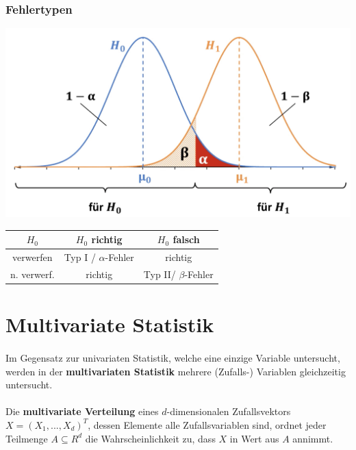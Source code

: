 \documentclass[a3paper, 8pt]{extarticle}
\begin{document}
\begin{multicols*}{5}
\subsubsection{Fehlertypen}
\begin{center}
\includegraphics[width=0.8\columnwidth]{Untitled 2.jpg}
\end{center}

    
\begin{center}
\begin{tabular}{ c | c | c }
 $H_0$ & $H_0$ richtig & $H_0$ falsch\\ \hline 
 verwerfen & Typ I / $\alpha$-Fehler & richtig \\
 n. verwerf. & richtig & Typ II/ $\beta$-Fehler
\end{tabular}
\end{center}

\section{ Multivariate Statistik}
\paragraph{} Im Gegensatz zur univariaten Statistik, welche eine einzige Variable untersucht, werden in der  \textbf{multivariaten Statistik} mehrere (Zufalls-) Variablen gleichzeitig untersucht.
\paragraph{} Die \textbf{multivariate Verteilung} eines $d$-dimensionalen Zufallsvektors $X=(X_1,...,X_d)^T$, dessen Elemente alle Zufallsvariablen sind, ordnet jeder Teilmenge $A \subseteq R^d$ die Wahrscheinlichkeit zu, dass $X$ in Wert aus $A$ annimmt.\\


\end{multicols*}
\end{document}
